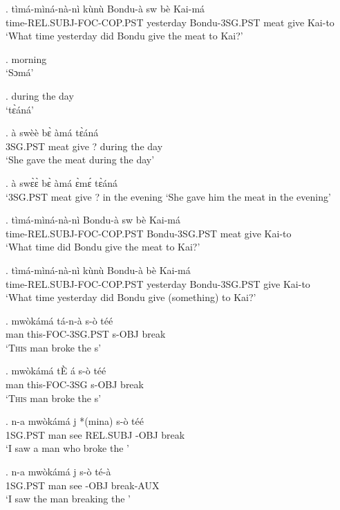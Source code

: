 \documentclass{assets/fieldnotes}
\begin{document}
\exg. tìmá-mìná-nà-nì kùnù Bondu-à sw bè Kai-má\\
time-REL.SUBJ-FOC-COP.PST yesterday Bondu-3SG.PST meat give Kai-to\\
`What time yesterday did Bondu give the meat to Kai?'

\exg. morning\\
`Sɔmá'

\exg. during the day\\
`tɛ̀áná'

\exg. à swèè bɛ̀ àmá tɛ̀áná\\
3SG.PST meat give ? during the day\\
`She gave the meat during the day'

\exg. à swɛ̀ɛ̀ bɛ̀ àmá ɛ̀mɛ́ tɛ̀áná\\
`3SG.PST meat give ?  in the evening
`She gave him the meat in the evening'

\exg. tìmá-mìná-nà-nì Bondu-à sw bè Kai-má\\
time-REL.SUBJ-FOC-COP.PST Bondu-3SG.PST meat give Kai-to\\
`What time did Bondu give the meat to Kai?'


\exg. tìmá-mìná-nà-nì kùnù Bondu-à bè Kai-má\\
time-REL.SUBJ-FOC-COP.PST yesterday Bondu-3SG.PST give Kai-to\\
`What time yesterday did Bondu give (something) to Kai?'

\exg. mwòkámá tá-n-à s-ò téé\\
man this-FOC-3SG.PST s-OBJ break\\
`\textsc{This} man broke the s'

\exg. mwòkámá t\`E á s-ò téé\\
man this-FOC-3SG s-OBJ break\\
`\textsc{This} man broke the s'

\exg. n-a mwòkámá j *(mina) s-ò téé\\
1SG.PST man see REL.SUBJ -OBJ break\\
`I saw a man who broke the '

\exg. n-a mwòkámá j s-ò té-à\\
1SG.PST man see -OBJ break-AUX\\
`I saw the man breaking the '
\end{document}
